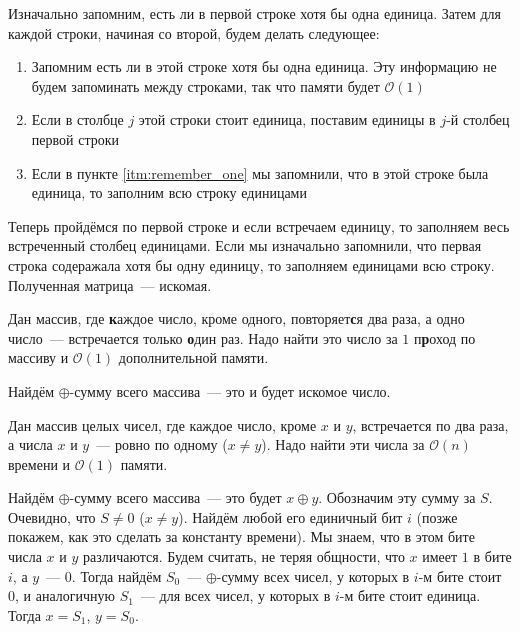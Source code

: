 \documentclass[addpoints]{exam}
\begin{document}
\begin{questions}
\begin{solution}
Изначально запомним, есть ли в первой строке хотя бы одна единица. Затем для каждой строки, начиная со второй, будем делать следующее:

\begin{enumerate}

\item \label{itm:remember_one} Запомним есть ли в этой строке хотя бы одна единица. Эту информацию не будем запоминать между строками, так что памяти будет $\mathcal{O}(1)$

\item Если в столбце $j$ этой строки стоит единица, поставим единицы в $j$-й столбец первой строки

\item Если в пункте \ref{itm:remember_one} мы запомнили, что в этой строке была единица, то заполним всю строку единицами

\end{enumerate}

Теперь пройдёмся по первой строке и если встречаем единицу, то заполняем весь встреченный столбец единицами. Если мы изначально запомнили, что первая строка содеражала хотя бы одну единицу, то заполняем единицами всю строку. Полученная матрица~--- искомая.

\end{solution}



\question[\half] Дан массив, где \textbf{к}аждое число, кроме одного, повторяет\textbf{с}я два раза, а одно число~--- встречается только \textbf{о}дин раз. Надо найти это число за $1$ п\textbf{р}оход по массиву и $\mathcal{O}(1)$ дополнительной памяти.

\begin{solution}

Найдём $\oplus$-сумму всего массива~--- это и будет искомое число.

\end{solution}

\question[1 \half] Дан массив целых чисел, где каждое число, кроме $x$ и $y$, встречается по два раза, а числа $x$ и $y$~--- ровно по одному ($x \neq y$). Надо найти эти числа за $\mathcal{O}(n)$ времени и $\mathcal{O}(1)$ памяти.

\begin{solution}

Найдём $\oplus$-сумму всего массива~--- это будет $x \oplus y$. Обозначим эту сумму за $S$. Очевидно, что $S \neq 0$ ($x \neq y$). Найдём любой его единичный бит $i$ (позже покажем, как это сделать за константу времени). Мы знаем, что в этом бите числа $x$ и $y$ различаются. Будем считать, не теряя общности, что $x$ имеет $1$ в бите $i$, а $y$~--- $0$. Тогда найдём $S_0$~--- $\oplus$-сумму всех чисел, у которых в $i$-м бите стоит $0$, и аналогичную $S_1$~--- для всех чисел, у которых в $i$-м бите стоит единица. Тогда $x = S_1$, $y = S_0$. 


\end{solution}
\end{questions}
\end{document}
